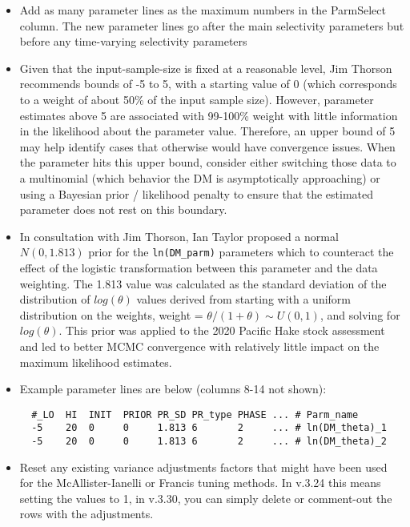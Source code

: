 \begin{itemize}
	\item Add as many parameter lines as the maximum numbers in the ParmSelect column. The new parameter lines go after the main selectivity parameters but before any time-varying selectivity parameters
	
\item Given that the input-sample-size is fixed at a reasonable level,
Jim Thorson recommends bounds of -5 to 5, with a starting value of 0
(which corresponds to a weight of about 50\% of the input sample size).
However, parameter estimates above 5 are associated with 99-100\% weight
with little information in the likelihood about the parameter value.
Therefore, an upper bound of 5 may help identify cases that otherwise
would have convergence issues.  When the parameter hits this upper
bound, consider either switching those data to a multinomial (which
behavior the DM is asymptotically approaching) or using a Bayesian prior
/ likelihood penalty to ensure that the estimated parameter does not
rest on this boundary.  	


\item In consultation with Jim Thorson, Ian Taylor proposed a normal
$N(0, 1.813)$ prior for the \texttt{ln(DM\_parm)} parameters which to
counteract the effect of the logistic transformation between this
parameter and the data weighting. The 1.813 value was calculated as the
standard deviation of the distribution of $log(\theta)$ values derived
from starting with a uniform distribution on the weights, weight =
$\theta/(1+\theta) \sim U(0,1)$, and solving for $log(\theta)$. This
prior was applied to the 2020 Pacific Hake stock assessment
\citep{grandin-status-2020} and led to better MCMC convergence with
relatively little impact on the maximum likelihood estimates. 
	
\item Example parameter lines are below (columns 8-14 not shown): 
    \begin{small}
      \begin{minipage}{\linewidth} 
\begin{verbatim}
  #_LO  HI  INIT  PRIOR PR_SD PR_type PHASE ... # Parm_name
  -5    20  0     0     1.813 6       2     ... # ln(DM_theta)_1
  -5    20  0     0     1.813 6       2     ... # ln(DM_theta)_2
\end{verbatim}
      \end{minipage}
    \end{small}
	
\item Reset any existing variance adjustments factors that might have been used for the McAllister-Ianelli or Francis tuning methods. In v.3.24 this means setting the values to 1, in v.3.30, you can simply delete or comment-out the rows with the adjustments.
\end{itemize}

